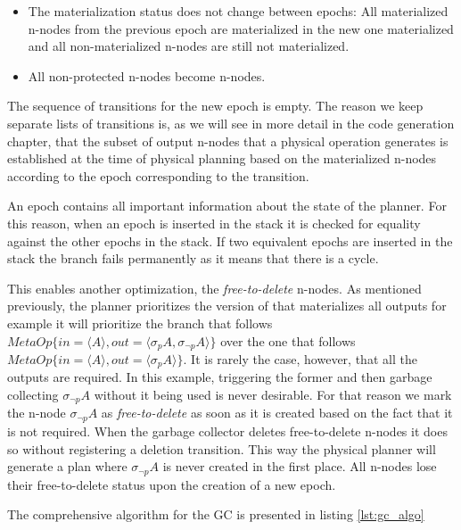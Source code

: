 \begin{itemize}
\item The materialization status does not change between epochs: All
  materialized n-nodes from the previous epoch are materialized in the
  new one materialized and all non-materialized n-nodes are still not
  materialized.
\item All non-protected  n-nodes become 
  n-nodes.
\end{itemize}

The sequence of transitions for the new epoch is empty. The reason we
keep separate lists of transitions is, as we will see in more detail
in the code generation chapter, that the subset of output n-nodes that a
physical operation generates is established at the time of physical
planning based on the materialized n-nodes according to the epoch
corresponding to the transition.

An epoch contains all important information about the state of the
planner. For this reason, when an epoch is inserted in the stack it is
checked for equality against the other epochs in the stack. If two
equivalent epochs are inserted in the stack the branch fails
permanently as it means that there is a cycle.

This enables another optimization, the \emph{free-to-delete} n-nodes. As
mentioned previously, the planner prioritizes the version of
 that materializes all outputs for example it will
prioritize the branch that follows
\(MetaOp\{in=\langle A \rangle, out=\langle \sigma_p A, \sigma_{\neg
  p} A \rangle \}\) over the one that follows
\(MetaOp\{in=\langle A \rangle, out=\langle \sigma_p A \rangle
\}\). It is rarely the case, however, that all the outputs are
required. In this example,
triggering the former  and then garbage collecting
\(\sigma_{\neg p} A\) without it being used is never desirable. For
that reason we mark the n-node \(\sigma_{\neg p} A\) as
\emph{free-to-delete} as soon as it is created based on the fact that
it is not required. When the garbage collector deletes free-to-delete
n-nodes it does so without registering a deletion transition. This way
the physical planner will generate a plan where \(\sigma_{\neg p} A\)
is never created in the first place. All n-nodes lose their
free-to-delete status upon the creation of a new epoch.

The comprehensive algorithm for the GC is presented in listing
\ref{lst:gc_algo}

